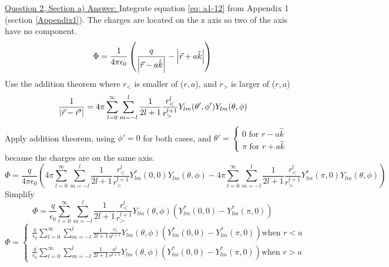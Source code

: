 \documentclass[12pt]{article}
\begin{document}
    \underline{Question 2, Section a) Answer: }
    Integrate equation \ref{eq: a1-12} from Appendix 1 (section \ref{Appendix1}). The charges are located on the z axis so two of the axis have no component.
    \begin{equation} \label{eq: 2-1}
        \Phi = \frac{1}{4 \pi \epsilon_0} \left(\frac{q}{\abs{\vec{r} - a \hat{k}}} - \abs{\vec{r} + a \hat{k}}\right)
    \end{equation}
    Use the addition theorem where $r_<$ is smaller of ($r,a$), and $r_>$ is larger of ($r,a$)
    \begin{equation} \label{eq: 2-2}
        \frac{1}{\abs{\vec{r}-\vec{r}'}} = 4 \pi \sum_{l=0}^\infty \sum_{m=-l}^l \frac{1}{2l+1} \frac{r_<^l}{r_>^{l+1}} Y_{lm}(\theta', \phi') Y_{lm}(\theta, \phi) 
    \end{equation}
    Apply addition theorem, using $\phi'=0$ for both cases, 
    \newline and $\theta'=
        \begin{cases} 
            \text{$0$ for $r-a\hat{k}$} 
            \\ \text{$\pi$ for $r+a\hat{k}$} 
        \end{cases}$ 
    \newline because the charges are on the same axis.
    \begin{equation} \label{eq: 2-3}
        \Phi = \frac{q}{4 \pi \epsilon_0} \left(4 \pi \sum_{l=0}^\infty \sum_{m=-l}^l \frac{1}{2l+1} \frac{r_<^l}{r_>^{l+1}} Y_{lm}^*(0, 0) Y_{lm}(\theta, \phi) -4 \pi \sum_{l=0}^\infty \sum_{m=-l}^l \frac{1}{2l+1} \frac{r_<^l}{r_>^{l+1}} Y_{lm}^*(\pi, 0) Y_{lm}(\theta, \phi)  \right)
    \end{equation}
    Simplify
    \begin{equation} \label{eq: 2-4}
        \Phi = \frac{q}{\epsilon_0} \sum_{l=0}^\infty \sum_{m=-l}^l \frac{1}{2l+1} \frac{r_<^l}{r_>^{l+1}} Y_{lm}(\theta, \phi) \left( Y_{lm}^*(0, 0) - Y_{lm}^*(\pi, 0) \right)
    \end{equation}
    \begin{equation} \label{eq: 2-5}
        \Phi = 
        \begin{cases}
            \frac{q}{\epsilon_0} \sum_{l=0}^\infty \sum_{m=-l}^l \frac{1}{2l+1} \frac{r_l}{a^{l+1}} Y_{lm}(\theta, \phi) \left( Y_{lm}^*(0, 0) - Y_{lm}^*(\pi, 0) \right) \text{when $r<a$}
            \\
            \frac{q}{\epsilon_0} \sum_{l=0}^\infty \sum_{m=-l}^l \frac{1}{2l+1} \frac{a^l}{r^{l+1}} Y_{lm}(\theta, \phi) \left( Y_{lm}^*(0, 0) - Y_{lm}^*(\pi, 0) \right) \text{when $r>a$}
        \end{cases}
    \end{equation}
\end{document}
